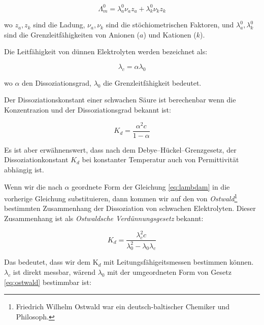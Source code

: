 
\begin{equation}
\label{eq:kohlrausch2}
	\Lambda _m^0
	=
	\lambda _a^0 \nu _a z_a + \lambda _k^0 \nu _k z_k
\end{equation}

wo $z_a, z_k$ sind die Ladung, $\nu _a, \nu _k$ sind die stöchiometrischen Faktoren, und $\lambda _a^0, \lambda _k^0$ sind die Grenzleitfähigkeiten von Anionen ($a$) und Kationen ($k$).

Die Leitfähigkeit von dünnen Elektrolyten werden bezeichnet als:

\begin{equation}
\label{eq:lambdam}
        \lambda_c
        =
        \alpha
	\lambda_0
\end{equation}

wo $\alpha$ den Dissoziationsgrad, $\lambda _0$ die Grenzleitfähigkeit bedeutet.

Der Dissoziationskonstant einer schwachen Säure ist berechenbar wenn die Konzentrazion und der Dissoziationsgrad bekannt ist:

\begin{equation}
\label{eq:kd}
        K_d
        =
        \frac{\alpha^2 c}{1-\alpha}
\end{equation}

Es ist aber erwähnenswert, dass nach dem Debye--Hückel--Grenzgesetz, der Dissoziationkonstant $K_d$ bei konstanter Temperatur auch von Permittivität abhängig ist.

Wenn wir die nach $\alpha$ geordnete Form der Gleichung \ref{eq:lambdam} in die vorherige Gleichung substituieren, dann kommen wir auf den von \emph{Ostwald}\footnote{Friedrich Wilhelm Ostwald war ein deutsch-baltischer Chemiker und Philosoph.} bestimmten Zusammenhang der Dissoziation von schwachen Elektrolyten. Dieser Zusammenhang ist als \emph{Ostwaldsche Verdünnungsgesetz} bekannt:

\begin{equation}
\label{eq:ostwald}
        K_d
        =
        \frac{\lambda_c^2 c}{\lambda_0^2 - \lambda_0\lambda_c}
\end{equation}

Das bedeutet, dass wir dem K$_d$ mit Leitungsfähigeitsmessen bestimmen können.
$\lambda_c$ ist direkt messbar, wärend $\lambda_0$ mit der umgeordneten Form von Gesetz \ref{eq:ostwald} bestimmbar ist:

